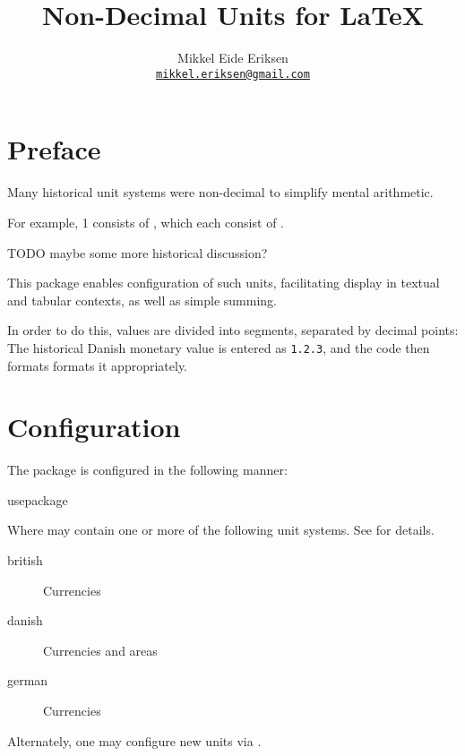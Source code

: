 \documentclass{article}
\title{Non-Decimal Units for \LaTeX}
\author{Mikkel Eide Eriksen\\\href{mailto:mikkel.eriksen@gmail.com}{\texttt{mikkel.eriksen@gmail.com}}}
\begin{document}
\maketitle

\section{Preface} %

Many historical unit systems were non-decimal to simplify mental arithmetic.

For example, 1  consists of  , which each consist of  .

TODO maybe some more historical discussion?

This package enables configuration of such units, facilitating display in textual and tabular contexts, as well as simple summing.

In order to do this, values are divided into segments, separated by decimal points: The historical Danish monetary value  is entered as \texttt{1.2.3}, and the code then formats formats it appropriately.

\section{Configuration} %

The package is configured in the following manner:

\begin{docCommand}
	{usepackage}
	{}

Where  may contain one or more of the following unit systems. See  for details.

\begin{description}
\item[british] Currencies
\item[danish] Currencies and areas
\item[german] Currencies
\end{description}

Alternately, one may configure new units via .

\end{docCommand}
\end{document}

